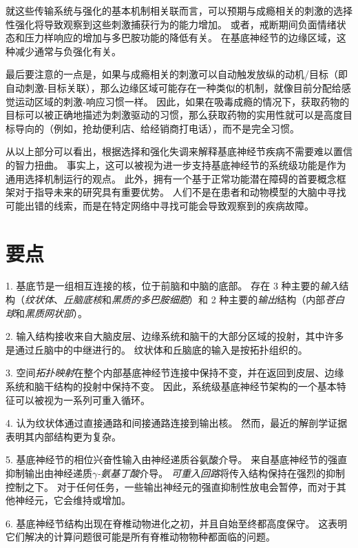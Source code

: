 就这些传输系统与强化的基本机制相关联而言，可以预期与成瘾相关的刺激的选择性强化将导致观察到这些刺激捕获行为的能力增加。
或者，戒断期间负面情绪状态和压力样响应的增加与多巴胺功能的降低有关。
在基底神经节的边缘区域，这种减少通常与负强化有关。


最后要注意的一点是，如果与成瘾相关的刺激可以自动触发放纵的动机/目标（即自动刺激-目标关联），那么边缘区域可能存在一种类似的机制，就像目前分配给感觉运动区域的刺激-响应习惯一样。
因此，如果在吸毒成瘾的情况下，获取药物的目标可以被正确地描述为刺激驱动的习惯，那么获取药物的实用性就可以是高度目标导向的（例如，抢劫便利店、给经销商打电话），而不是完全习惯。


从以上部分可以看出，根据选择和强化失调来解释基底神经节疾病不需要难以置信的智力扭曲。
事实上，这可以被视为进一步支持基底神经节的系统级功能是作为通用选择机制运行的观点。
此外，拥有一个基于正常功能潜在障碍的首要概念框架对于指导未来的研究具有重要优势。
人们不是在患者和动物模型的大脑中寻找可能出错的线索，而是在特定网络中寻找可能会导致观察到的疾病故障。



\section{要点}

1. 基底节是一组相互连接的核，位于前脑和中脑的底部。
存在 3 种主要的\textit{输入}结构（\textit{纹状体}、\textit{丘脑底核}和\textit{黑质的多巴胺细胞}）和 2 种主要的\textit{输出}结构（内部\textit{苍白球}和\textit{黑质网状部}）。


2. 输入结构接收来自大脑皮层、边缘系统和脑干的大部分区域的投射，其中许多是通过丘脑中的中继进行的。
纹状体和丘脑底的输入是按拓扑组织的。


3. 空间\textit{拓扑映射}在整个内部基底神经节连接中保持不变，并在返回到皮层、边缘系统和脑干结构的投射中保持不变。
因此，系统级基底神经节架构的一个基本特征可以被视为一系列可重入循环。


4. 认为纹状体通过直接通路和间接通路连接到输出核。
然而，最近的解剖学证据表明其内部结构更为复杂。


5. 基底神经节的相位兴奋性输入由神经递质谷氨酸介导。
来自基底神经节的强直抑制输出由神经递质\textit{$\gamma$-氨基丁酸}介导。
\textit{可重入回路}将传入结构保持在强烈的抑制控制之下。
对于任何任务，一些输出神经元的强直抑制性放电会暂停，而对于其他神经元，它会维持或增加。


6. 基底神经节结构出现在脊椎动物进化之初，并且自始至终都高度保守。
这表明它们解决的计算问题很可能是所有脊椎动物物种都面临的问题。


